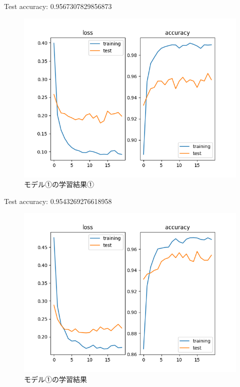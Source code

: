 \documentclass[dvipdfmx]{beamer}
\begin{document}
  \begin{frame}
    Test accuracy: 0.9567307829856873
    \begin{figure}
      \centering
      \includegraphics[keepaspectratio, scale=0.6]{images/train_ffn.png}
      \caption{モデル①の学習結果①}
    \end{figure}
  \end{frame}

  \begin{frame}
    Test accuracy: 0.9543269276618958
    \begin{figure}
      \centering
      \includegraphics[keepaspectratio, scale=0.6]{images/train_ffn_dropout.png}
      \caption{モデル①の学習結果}
    \end{figure}
  \end{frame}
\end{document}
